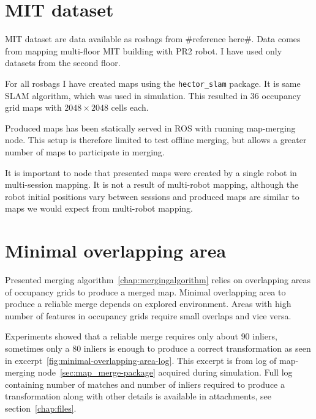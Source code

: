 \section{\gls{MIT} dataset}

\gls{MIT} dataset are data available as rosbags from \#reference here\#. Data comes from mapping multi-floor \gls{MIT} building with PR2 robot. I have used only datasets from the second floor.

For all rosbags I have created maps using the \texttt{hector\_slam} package. It is same \gls{SLAM} algorithm, which was used in simulation. This resulted in $36$ occupancy grid maps with $2048 \times 2048$ cells each.

Produced maps has been statically served in \gls{ROS} with running map-merging node. This setup is therefore limited to test offline merging, but allows a greater number of maps to participate in merging.

It is important to node that presented maps were created by a single robot in multi-session mapping. It is not a result of multi-robot mapping, although the robot initial positions vary between sessions and produced maps are similar to maps we would expect from multi-robot mapping.

\section{Minimal overlapping area}

Presented merging algorithm~\ref{chap:mergingalgorithm} relies on overlapping areas of occupancy grids to produce a merged map. Minimal overlapping area to produce a reliable merge depends on explored environment. Areas with high number of features in occupancy grids require small overlaps and vice versa.

Experiments showed that a reliable merge requires only about $90$ inliers, sometimes only a $80$ inliers is enough to produce a correct transformation as seen in excerpt~\ref{fig:minimal-overlapping-area-log}. This excerpt is from log of map-merging node~\ref{sec:map_merge-package} acquired during simulation. Full log containing number of matches and number of inliers required to produce a transformation along with other details is available in attachments, see section~\ref{chap:files}.


